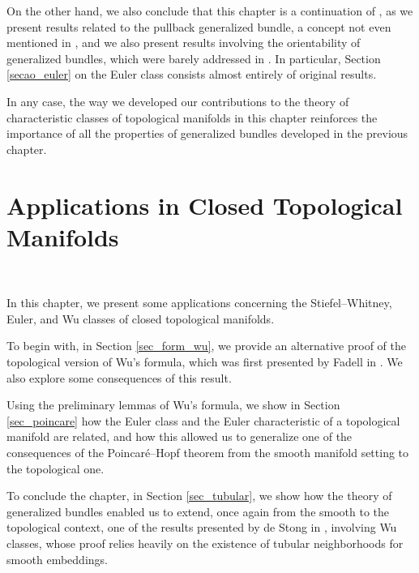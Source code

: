 \documentclass[12pt,oneside]{book}
\begin{document}
    On the other hand, we also conclude that this chapter is a continuation of \cite{fadell_1}, as we present results related to the 
    pullback generalized bundle, a concept not even mentioned in \cite{fadell_1}, and we also present 
    results involving the orientability of generalized bundles, which were barely addressed in 
    \cite{fadell_1}. In particular, Section \ref{secao_euler} on the Euler class consists almost entirely of original results.

    In any case, the way we developed our contributions to the theory of characteristic classes of topological manifolds in this chapter 
    reinforces the importance of all the properties of generalized bundles developed in the previous chapter.



    \chapter{Applications in Closed Topological Manifolds}\label{cap_aplic}
    \thispagestyle{empty}

    \

    In this chapter, we present some applications concerning the Stiefel–Whitney, Euler, and Wu classes of closed topological manifolds.

    To begin with, in Section \ref{sec_form_wu}, we provide an alternative proof of the topological version of Wu's formula, which was first presented by Fadell in \cite{fadell_1}. We also explore some consequences of this result.

    Using the preliminary lemmas of Wu's formula, we show in Section \ref{sec_poincare} how the Euler class and the Euler characteristic of a topological manifold are related, and how this allowed us to generalize one of the consequences of the Poincaré–Hopf theorem from the smooth manifold setting to the topological one.

    To conclude the chapter, in Section \ref{sec_tubular}, we show how the theory of generalized bundles enabled us to extend, once again from the smooth to the topological context, one of the results presented by de Stong in \cite{stong}, involving Wu classes, whose proof relies heavily on the existence of tubular neighborhoods for smooth embeddings.
\end{document}
